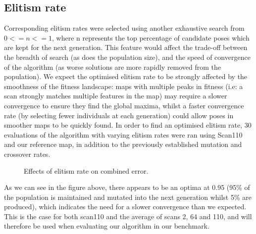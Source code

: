 \documentclass[authoryearcitations]{UoYCSproject}
\begin{document}
\subsection{Elitism rate}
\label{subsec:elite_elitism_rate}
Corresponding elitism rates were selected using another exhaustive search from $0 <= n <= 1$, where n represents the top percentage of candidate poses which are kept for the next generation. This feature would affect the trade-off between the breadth of search (as does the population size), and the speed of convergence of the algorithm (as worse solutions are more rapidly removed from the population). We expect the optimised elitism rate to be strongly affected by the smoothness of the fitness landscape: maps with multiple peaks in fitness (i.e: a scan strongly matches multiple features in the map) may require a slower convergence to ensure they find the global maxima, whilst a faster convergence rate (by selecting fewer individuals at each generation) could allow poses in smoother maps to be quickly found. In order to find an optimised elitism rate, 30 evaluations of the algorithm with varying elitism rates were ran using Scan110 and our reference map, in addition to the previously established mutation and crossover rates. \newline

\begin{figure}
	\centering
	\caption[Optimising elitism rate for scan/map]{Effects of elitism rate on combined error.}
	\label{fig:elitsm_rates}
\end{figure}
As we can see in the figure above, there appears to be an optima at 0.95 (95\% of the population is maintained and mutated into the next generation whilst 5\% are produced), which indicates the need for a slower convergence than we expected. This is the case for both scan110 and the average of scans 2, 64 and 110, and will therefore be used when evaluating our algorithm in our benchmark.
\end{document}
